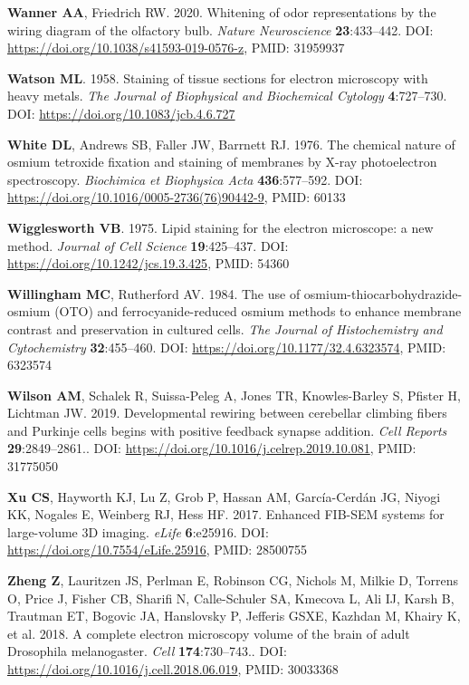 \documentclass{article}
\newenvironment{reflist}{\par\small\setlength{\parindent}{0pt}\everypar{\hangindent=2.2em\hangafter=1}}{\par}
\begin{document}
\begin{reflist}
\textbf{Wanner AA}, Friedrich RW. 2020. Whitening of odor representations by the wiring diagram of the olfactory bulb. \emph{Nature Neuroscience} \textbf{23}:433–442. DOI: \url{https://doi.org/10.1038/s41593-019-0576-z}, PMID: 31959937

\textbf{Watson ML}. 1958. Staining of tissue sections for electron microscopy with heavy metals. \emph{The Journal of Biophysical and Biochemical Cytology} \textbf{4}:727–730. DOI: \url{https://doi.org/10.1083/jcb.4.6.727}

\textbf{White DL}, Andrews SB, Faller JW, Barrnett RJ. 1976. The chemical nature of osmium tetroxide fixation and staining of membranes by X-ray photoelectron spectroscopy. \emph{Biochimica et Biophysica Acta} \textbf{436}:577–592. DOI: \url{https://doi.org/10.1016/0005-2736(76)90442-9}, PMID: 60133

\textbf{Wigglesworth VB}. 1975. Lipid staining for the electron microscope: a new method. \emph{Journal of Cell Science} \textbf{19}:425–437. DOI: \url{https://doi.org/10.1242/jcs.19.3.425}, PMID: 54360

\textbf{Willingham MC}, Rutherford AV. 1984. The use of osmium-thiocarbohydrazide-osmium (OTO) and ferrocyanide-reduced osmium methods to enhance membrane contrast and preservation in cultured cells. \emph{The Journal of Histochemistry and Cytochemistry} \textbf{32}:455–460. DOI: \url{https://doi.org/10.1177/32.4.6323574}, PMID: 6323574

\textbf{Wilson AM}, Schalek R, Suissa-Peleg A, Jones TR, Knowles-Barley S, Pfister H, Lichtman JW. 2019. Developmental rewiring between cerebellar climbing fibers and Purkinje cells begins with positive feedback synapse addition. \emph{Cell Reports} \textbf{29}:2849–2861.. DOI: \url{https://doi.org/10.1016/j.celrep.2019.10.081}, PMID: 31775050

\textbf{Xu CS}, Hayworth KJ, Lu Z, Grob P, Hassan AM, García-Cerdán JG, Niyogi KK, Nogales E, Weinberg RJ, Hess HF. 2017. Enhanced FIB-SEM systems for large-volume 3D imaging. \emph{eLife} \textbf{6}:e25916. DOI: \url{https://doi.org/10.7554/eLife.25916}, PMID: 28500755

\textbf{Zheng Z}, Lauritzen JS, Perlman E, Robinson CG, Nichols M, Milkie D, Torrens O, Price J, Fisher CB, Sharifi N, Calle-Schuler SA, Kmecova L, Ali IJ, Karsh B, Trautman ET, Bogovic JA, Hanslovsky P, Jefferis GSXE, Kazhdan M, Khairy K, et al. 2018. A complete electron microscopy volume of the brain of adult Drosophila melanogaster. \emph{Cell} \textbf{174}:730–743.. DOI: \url{https://doi.org/10.1016/j.cell.2018.06.019}, PMID: 30033368
\end{reflist}
\end{document}
